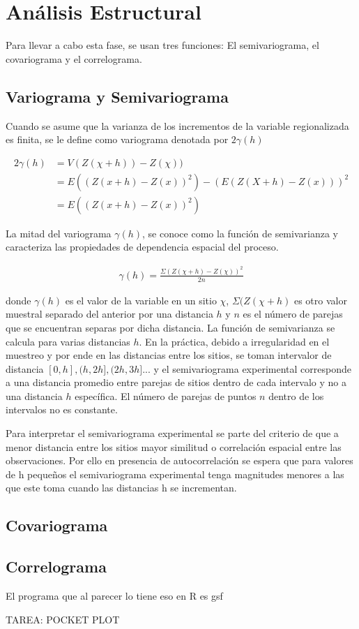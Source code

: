 \section{Análisis Estructural}

Para llevar a cabo esta fase, se usan tres funciones: El semivariograma, el covariograma y el correlograma.  

\subsection{Variograma y Semivariograma}

Cuando se asume que la varianza de los incrementos de la variable regionalizada es finita, se le define como variograma denotada por $2\gamma(h)$ 

\begin{equation*}
\begin{aligned}
   2\gamma(h) & = V(Z(\chi + h)) - Z(\chi))\\
  & = E((Z(x + h) - Z(x))^2) - (E(Z(X + h) - Z(x)))^2 \\
  & = E((Z(x + h) - Z(x))^2)
\end{aligned}
\end{equation*}

La mitad del variograma $\gamma(h)$, se conoce como la función de semivarianza y caracteriza las propiedades de dependencia espacial del proceso. 

\begin{equation*}
\begin{aligned}
   \gamma(h)  = \frac{\Sigma(Z(\chi + h) - Z(\chi))^2}{2n}
\end{aligned}
\end{equation*}


donde $\gamma(h) $ es el valor de la variable en un sitio $\chi$, $\Sigma(Z(\chi + h) $ es otro valor muestral separado del anterior por una distancia $h$ y $n$ es el número de parejas que se encuentran separas por dicha distancia. La función de semivarianza se calcula para varias distancias $h$. En la práctica, debido a irregularidad en el muestreo y por ende en las distancias entre los sitios, se toman intervalor de distancia $[0,h], (h,2h], (2h, 3h]$... y el semivariograma experimental corresponde a una distancia promedio entre parejas de sitios dentro de cada intervalo y no a una distancia $h$ específica. El número de parejas de puntos $n$ dentro de los intervalos no es constante.

Para interpretar el semivariograma experimental se parte del criterio de que a menor distancia entre los sitios mayor similitud o correlación espacial entre las observaciones. Por ello en presencia de autocorrelación se espera que para valores de h pequeños el semivariograma experimental tenga magnitudes menores a las que este toma cuando las distancias h se incrementan.

\subsection{Covariograma}




\subsection{Correlograma}
El programa que al parecer lo tiene eso en R es gsf


TAREA: POCKET PLOT 




